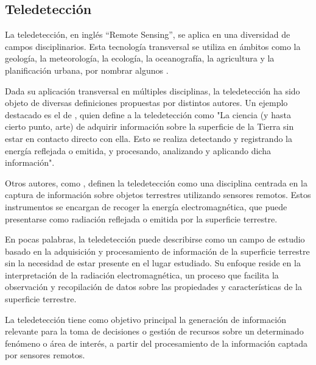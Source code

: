 \subsection{Teledetección}

La teledetección, en inglés ``Remote Sensing'', se aplica en una diversidad de campos disciplinarios. Esta tecnología transversal se utiliza en ámbitos como la geología, la meteorología, la ecología, la oceanografía, la agricultura y la planificación urbana, por nombrar algunos \cite{schowengerdt2006remote}.

Dada su aplicación transversal en múltiples disciplinas, la teledetección ha sido objeto de diversas definiciones propuestas por distintos autores. Un ejemplo destacado es el de , quien define a la teledetección como "La ciencia (y hasta cierto punto, arte) de adquirir información sobre la superficie de la Tierra sin estar en contacto directo con ella. Esto se realiza detectando y registrando la energía reflejada o emitida, y procesando, analizando y aplicando dicha información".

Otros autores, como , definen la teledetección como una disciplina centrada en la captura de información sobre objetos terrestres utilizando sensores remotos. Estos instrumentos se encargan de recoger la energía electromagnética, que puede presentarse como radiación reflejada o emitida por la superficie terrestre.

En pocas palabras, la teledetección puede describirse como un campo de estudio basado en la adquisición y procesamiento de información de la superficie terrestre sin la necesidad de estar presente en el lugar estudiado. Su enfoque reside en la interpretación de la radiación electromagnética, un proceso que facilita la observación y recopilación de datos sobre las propiedades y características de la superficie terrestre.

La teledetección tiene como objetivo principal la generación de información relevante para la toma de decisiones o gestión de recursos sobre un determinado fenómeno o área de interés, a partir del procesamiento de la información captada por sensores remotos.

